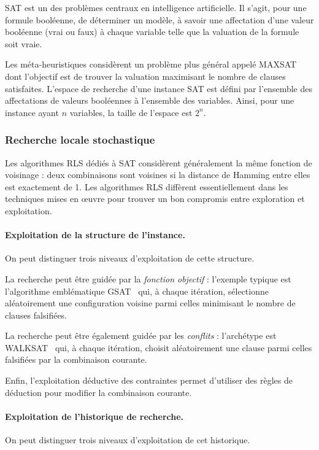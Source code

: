 \documentclass[12pt,a4paper]{book}
\begin{document}
SAT est un des problèmes centraux en intelligence artificielle. Il s'agit, pour une formule booléenne, de déterminer un modèle, à savoir une affectation d'une valeur booléenne (vrai ou faux) à chaque variable telle que la valuation de la formule soit vraie.

Les méta-heuristiques considèrent un problème plus général appelé MAXSAT dont l'objectif est de trouver la valuation maximisant le nombre de clauses satisfaites. L'espace de recherche d'une instance SAT est défini par l'ensemble des affectations de valeurs booléennes à l'ensemble des variables. Ainsi, pour une instance ayant $n$ variables, la taille de l'espace est $2^n$.

\subsubsection*{Recherche locale stochastique}

Les algorithmes RLS dédiés à SAT considèrent généralement la même fonction de voisinage : deux combinaisons sont voisines si la distance de Hamming entre elles est exactement de 1. Les algorithmes RLS diffèrent essentiellement dans les techniques mises en œuvre pour trouver un bon compromis entre exploration et exploitation.

\paragraph{Exploitation de la structure de l'instance.}
On peut distinguer trois niveaux d'exploitation de cette structure.

La recherche peut être guidée par la \textit{fonction objectif} : l'exemple typique est l'algorithme emblématique GSAT~\cite{selman1992} qui, à chaque itération, sélectionne aléatoirement une configuration voisine parmi celles minimisant le nombre de clauses falsifiées.

La recherche peut être également guidée par les \textit{conflits} : l'archétype est WALKSAT~\cite{mcallester1997} qui, à chaque itération, choisit aléatoirement une clause parmi celles falsifiées par la combinaison courante.

Enfin, l'exploitation déductive des contraintes permet d'utiliser des règles de déduction pour modifier la combinaison courante.

\paragraph{Exploitation de l'historique de recherche.}
On peut distinguer trois niveaux d'exploitation de cet historique.
\end{document}
